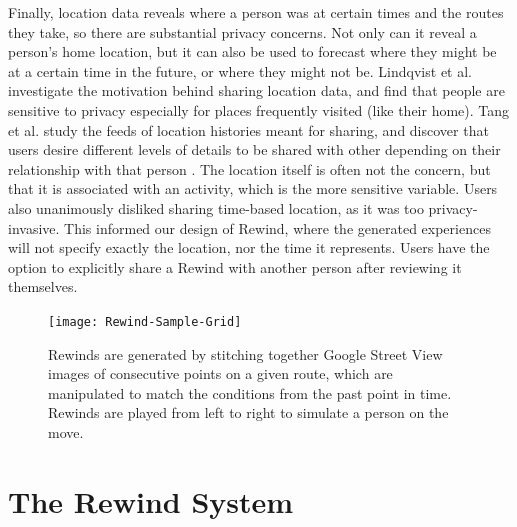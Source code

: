 \documentclass{sigchi}
\begin{document}
Finally, location data reveals where a person was at certain times and the routes they take, so there are substantial privacy concerns. Not only can it reveal a person's home location, but it can also be used to forecast where they might be at a certain time in the future, or where they might not be. Lindqvist et al. \cite{lindqvist2011m} investigate the motivation behind sharing location data, and find that people are sensitive to privacy especially for places frequently visited (like their home). Tang et al. study the feeds of location histories meant for sharing, and discover that users desire different levels of details to be shared with other depending on their relationship with that person \cite{tang2011understanding}. The location itself is often not the concern, but that it is associated with an activity, which is the more sensitive variable. Users also unanimously disliked sharing time-based location, as it was too privacy-invasive. This informed our design of Rewind, where the generated experiences will not specify exactly the location, nor the time it represents. Users have the option to explicitly share a Rewind with another person after reviewing it themselves.

\begin{figure}[h]
   \centering
     \texttt{[image: Rewind-Sample-Grid]}
     \caption{Rewinds are generated by stitching together Google Street View images of consecutive points on a given route, which are manipulated to match the conditions from the past point in time. Rewinds are played from left to right to simulate a person on the move.}
     \label{fig:rewinds}
\end{figure}

\section{The Rewind System}
\end{document}
